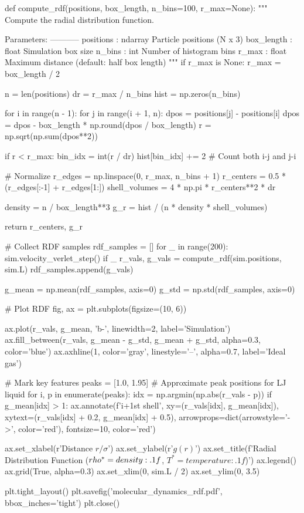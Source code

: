 \documentclass[11pt,a4paper]{article}
\begin{document}
\begin{pycode}
def compute_rdf(positions, box_length, n_bins=100, r_max=None):
    """
    Compute the radial distribution function.

    Parameters:
    -----------
    positions : ndarray
        Particle positions (N x 3)
    box_length : float
        Simulation box size
    n_bins : int
        Number of histogram bins
    r_max : float
        Maximum distance (default: half box length)
    """
    if r_max is None:
        r_max = box_length / 2

    n = len(positions)
    dr = r_max / n_bins
    hist = np.zeros(n_bins)

    for i in range(n - 1):
        for j in range(i + 1, n):
            dpos = positions[j] - positions[i]
            dpos = dpos - box_length * np.round(dpos / box_length)
            r = np.sqrt(np.sum(dpos**2))

            if r < r_max:
                bin_idx = int(r / dr)
                hist[bin_idx] += 2  # Count both i-j and j-i

    # Normalize
    r_edges = np.linspace(0, r_max, n_bins + 1)
    r_centers = 0.5 * (r_edges[:-1] + r_edges[1:])
    shell_volumes = 4 * np.pi * r_centers**2 * dr

    density = n / box_length**3
    g_r = hist / (n * density * shell_volumes)

    return r_centers, g_r

# Collect RDF samples
rdf_samples = []
for _ in range(200):
    sim.velocity_verlet_step()
    if _ %
        r_vals, g_vals = compute_rdf(sim.positions, sim.L)
        rdf_samples.append(g_vals)

g_mean = np.mean(rdf_samples, axis=0)
g_std = np.std(rdf_samples, axis=0)

# Plot RDF
fig, ax = plt.subplots(figsize=(10, 6))

ax.plot(r_vals, g_mean, 'b-', linewidth=2, label='Simulation')
ax.fill_between(r_vals, g_mean - g_std, g_mean + g_std, alpha=0.3, color='blue')
ax.axhline(1, color='gray', linestyle='--', alpha=0.7, label='Ideal gas')

# Mark key features
peaks = [1.0, 1.95]  # Approximate peak positions for LJ liquid
for i, p in enumerate(peaks):
    idx = np.argmin(np.abs(r_vals - p))
    if g_mean[idx] > 1:
        ax.annotate(f'{i+1}st shell', xy=(r_vals[idx], g_mean[idx]),
                    xytext=(r_vals[idx] + 0.2, g_mean[idx] + 0.5),
                    arrowprops=dict(arrowstyle='->', color='red'),
                    fontsize=10, color='red')

ax.set_xlabel(r'Distance $r/\sigma$')
ax.set_ylabel(r'$g(r)$')
ax.set_title(f'Radial Distribution Function ($\\rho^* = {density:.1f}$, $T^* = {temperature:.1f}$)')
ax.legend()
ax.grid(True, alpha=0.3)
ax.set_xlim(0, sim.L / 2)
ax.set_ylim(0, 3.5)

plt.tight_layout()
plt.savefig('molecular_dynamics_rdf.pdf', bbox_inches='tight')
plt.close()
\end{pycode}
\end{document}
